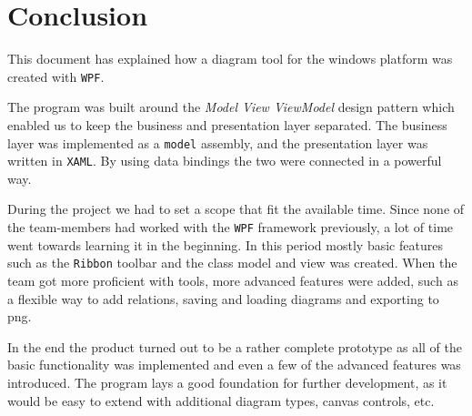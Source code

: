 \section{Conclusion}

This document has explained how a diagram tool for the windows platform was
created with \texttt{WPF}. 

The program was built around the \textit{Model View ViewModel} design pattern
which enabled us to keep the business and presentation layer separated. The
business layer was implemented as a \texttt{model} assembly, and the
presentation layer was written in \texttt{XAML}. By using data bindings the two
were connected in a powerful way. 

During the project we had to set a scope that fit the available time. Since none
of the team-members had worked with the \texttt{WPF} framework previously, a lot
of time went towards learning it in the beginning. In this period mostly basic
features such as the \texttt{Ribbon} toolbar and the class model and view was
created. When the team got more proficient with tools, more advanced features
were added, such as a flexible way to add relations, saving and loading diagrams
and exporting to png. 

In the end the product turned out to be a rather complete prototype as all of
the basic functionality was implemented and even a few of the advanced features
was introduced. The program lays a good foundation for further development, as
it would be easy to extend with additional diagram types, canvas controls, etc.
